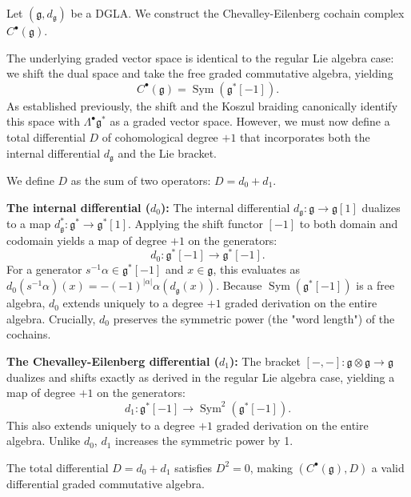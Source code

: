\begin{construction}\label{2.3.2}
    Let $(\mathfrak{g}, d_\mathfrak{g})$ be a DGLA. We construct the Chevalley-Eilenberg cochain complex $C^\bullet(\mathfrak{g})$. 
    
    The underlying graded vector space is identical to the regular Lie algebra case: we shift the dual space and take the free graded commutative algebra, yielding
    \[
        C^\bullet(\mathfrak{g}) = \operatorname{Sym}(\mathfrak{g}^*[-1]).
    \]
    As established previously, the shift and the Koszul braiding canonically identify this space with $\Lambda^\bullet \mathfrak{g}^*$ as a graded vector space. However, we must now define a total differential $D$ of cohomological degree $+1$ that incorporates both the internal differential $d_\mathfrak{g}$ and the Lie bracket.

    We define $D$ as the sum of two operators: $D = d_0 + d_1$.

    \textbf{The internal differential ($d_0$):} 
    The internal differential $d_\mathfrak{g} : \mathfrak{g} \to \mathfrak{g}[1]$ dualizes to a map $d_\mathfrak{g}^* : \mathfrak{g}^* \to \mathfrak{g}^*[1]$. Applying the shift functor $[-1]$ to both domain and codomain yields a map of degree $+1$ on the generators:
    \[
        d_0 : \mathfrak{g}^*[-1] \to \mathfrak{g}^*[-1].
    \]
    For a generator $s^{-1}\alpha \in \mathfrak{g}^*[-1]$ and $x \in \mathfrak{g}$, this evaluates as $d_0(s^{-1}\alpha)(x) = -(-1)^{\left| \alpha \right|} \alpha(d_\mathfrak{g}(x))$. Because $\operatorname{Sym}(\mathfrak{g}^*[-1])$ is a free algebra, $d_0$ extends uniquely to a degree $+1$ graded derivation on the entire algebra. Crucially, $d_0$ preserves the symmetric power (the "word length") of the cochains.

    \textbf{The Chevalley-Eilenberg differential ($d_1$):}
    The bracket $[-,-] : \mathfrak{g} \otimes \mathfrak{g} \to \mathfrak{g}$ dualizes and shifts exactly as derived in the regular Lie algebra case, yielding a map of degree $+1$ on the generators:
    \[
        d_1 : \mathfrak{g}^*[-1] \to \operatorname{Sym}^2(\mathfrak{g}^*[-1]).
    \]
    This also extends uniquely to a degree $+1$ graded derivation on the entire algebra. Unlike $d_0$, $d_1$ increases the symmetric power by 1.
\end{construction}

\begin{proposition}\label{2.3.3}
    The total differential $D = d_0 + d_1$ satisfies $D^2 = 0$, making $(C^\bullet(\mathfrak{g}), D)$ a valid differential graded commutative algebra.
\end{proposition}

